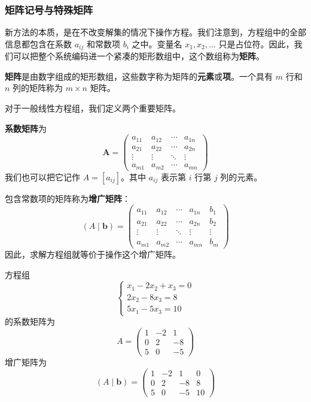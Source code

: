 \subsubsection{矩阵记号与特殊矩阵}

新方法的本质，是在不改变解集的情况下操作方程。我们注意到，方程组中的全部信息都包含在系数 $a_{ij}$ 和常数项 $b_i$ 之中。变量名 $x_1,x_2,\ldots$ 只是占位符。因此，我们可以把整个系统编码进一个紧凑的矩形数组中，这个数组称为\textbf{矩阵}。

\begin{definition}
\textbf{矩阵}是由数字组成的矩形数组，这些数字称为矩阵的\textbf{元素}或\textbf{项}。一个具有 $m$ 行和 $n$ 列的矩阵称为 $m\times n$ 矩阵。
\end{definition}

对于一般线性方程组，我们定义两个重要矩阵。

\textbf{系数矩阵}为
\[ \textbf{A} = \begin{pmatrix}
a_{11} & a_{12} & \cdots & a_{1n} \\
a_{21} & a_{22} & \cdots & a_{2n} \\
\vdots & \vdots & \ddots & \vdots \\
a_{m1} & a_{m2} & \cdots & a_{mn}
\end{pmatrix} \]
我们也可以把它记作 $A=[a_{ij}]$。其中 $a_{ij}$ 表示第 $i$ 行第 $j$ 列的元素。

包含常数项的矩阵称为\textbf{增广矩阵}：
\[ (A \mid \mathbf{b}) = \left(\begin{array}{cccc|c}
a_{11} & a_{12} & \cdots & a_{1n} & b_1 \\
a_{21} & a_{22} & \cdots & a_{2n} & b_2 \\
\vdots & \vdots & \ddots & \vdots & \vdots \\
a_{m1} & a_{m2} & \cdots & a_{mn} & b_m
\end{array}\right) \]
因此，求解方程组就等价于操作这个增广矩阵。

\begin{example}
方程组
\[
\begin{cases}
x_1 - 2x_2 + x_3 = 0 \\
2x_2 - 8x_3 = 8 \\
5x_1 - 5x_3 = 10
\end{cases}
\]
的系数矩阵为
\[ A = \begin{pmatrix} 1 & -2 & 1 \\ 0 & 2 & -8 \\ 5 & 0 & -5 \end{pmatrix} \]
增广矩阵为
\[ (A \mid \mathbf{b}) = \left(\begin{array}{ccc|c} 1 & -2 & 1 & 0 \\ 0 & 2 & -8 & 8 \\ 5 & 0 & -5 & 10 \end{array}\right) \]
\end{example}

